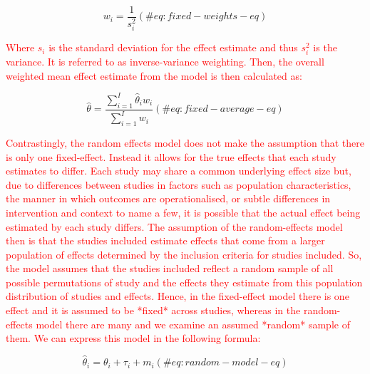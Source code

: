 \documentclass[
]{article}
\begin{document}
\begin{equation}
w_{i}=\frac{1}{s^2_{i}}
(\#eq:fixed-weights-eq)
\end{equation}

\textcolor{red}{Where $s_{i}$ is the standard deviation for the effect estimate and thus $s^2_{i}$ is the variance. It is referred to as inverse-variance weighting. Then, the overall weighted mean effect estimate from the model is then calculated as:}

\begin{equation}
\hat\theta=\frac{\sum^I_{i=1}\hat\theta_{i}w_{i}}{\sum^I_{i=1}w_{i}}
(\#eq:fixed-average-eq)
\end{equation}

\textcolor{red}{Contrastingly, the random effects model does not make the assumption that there is only one fixed-effect. Instead it allows for the true effects that each study estimates to differ. Each study may share a common underlying effect size but, due to differences between studies in factors such as population characteristics, the manner in which outcomes are operationalised, or subtle differences in intervention and context to name a few, it is possible that the actual effect being estimated by each study differs. The assumption of the random-effects model then is that the studies included estimate effects that come from a larger population of effects determined by the inclusion criteria for studies included. So, the model assumes that the studies included reflect a random sample of all possible permutations of study and the effects they estimate from this population distribution of studies and effects. Hence, in the fixed-effect model there is one effect and it is assumed to be *fixed* across studies, whereas in the random-effects model there are many and we examine an assumed *random* sample of them. We can express this model in the following formula:}

\begin{equation}
\hat\theta_{i}=\theta_{i}+\tau_{i}+m_{i}
(\#eq:random-model-eq)
\end{equation}
\end{document}
